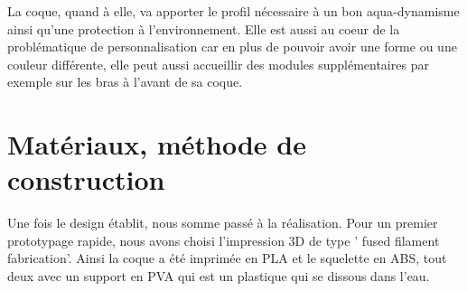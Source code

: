 \documentclass[a4paper,11pt]{report}
\begin{document}
			La coque, quand à elle, va apporter le profil nécessaire à un bon aqua-dynamisme ainsi qu'une protection à l'environnement. Elle est aussi au coeur de la problématique de personnalisation car en plus de pouvoir avoir une forme ou une couleur différente, elle peut aussi accueillir des modules supplémentaires par exemple sur les bras à l'avant de sa coque.
			
			\section{Matériaux, méthode de construction}
			
			Une fois le design établit, nous somme passé à la réalisation. Pour un premier prototypage rapide, nous avons choisi l'impression 3D de type ' fused filament fabrication'. Ainsi la coque a été imprimée en PLA et le squelette en ABS, tout deux avec un support en PVA qui est un plastique qui se dissous dans l'eau.
			
\end{document}

